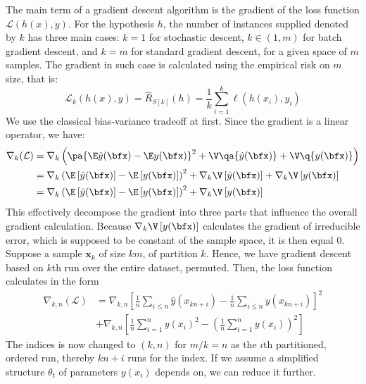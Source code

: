 \documentclass[
  journal=largetwo,
  year=2025,
  volume=37,
]{cup-journal}
\begin{document}
The main term of a gradient descent algorithm is the gradient of the loss function $\mathcal{L}(h(x),y)$. For the hypothesis $h$, the number of instances supplied denoted by $k$ has three main cases: $k=1$ for stochastic descent, $k\in (1,m)$ for batch gradient descent, and $k=m$ for standard gradient descent, for a given space of $m$ samples. The gradient in such case is calculated using the empirical risk on $m$ size, that is: 
\begin{equation}
    \mathcal{L}_{k}(h(x),y) = \hat{R}_{S[k]}(h) = \frac{1}{k} \sum^{k}_{i=1} \ell(h(x_{i}),y_{i})
\end{equation}
We use the classical bias-variance tradeoff at first. Since the gradient is a linear operator, we have: 
\begin{equation}
    \begin{split}
        \nabla_{k}(\mathcal{L}) &= \nabla_{k}\left(\pa{\E\hat{y}(\bfx) - \E y(\bfx)}^2 + \V\qa{\hat{y}(\bfx)} + \V\q{y(\bfx)}\right)\\
        & = \nabla_{k}\left( \E\left[\hat{y}(\bfx)\right] - \E\left[y(\bfx)\right] \right)^2 + \nabla_{k}\V\left[\hat{y}(\bfx)\right] + \nabla_{k}\V\left[y(\bfx)\right] \\
        & = \nabla_{k}\left( \E\left[\hat{y}(\bfx)\right] - \E\left[y(\bfx)\right] \right)^2 + \nabla_{k}\V\left[y(\bfx)\right]
    \end{split}
\end{equation}
This effectively decompose the gradient into three parts that influence the overall gradient calculation. Because $\nabla_{k}\V\left[y(\bfx)\right]$ calculates the gradient of irreducible error, which is supposed to be constant of the sample space, it is then equal $0$. Suppose a sample $\mathbf{x}_{k}$ of size $km$, of partition $k$. Hence, we have gradient descent based on $k$th run over the entire dataset, permuted. Then, the loss function calculates in the form 
\begin{equation}
  \begin{split}
    \nabla_{k,n}(\mathcal{L}) &= \nabla_{k,n}\left[ \frac{1}{n}\sum_{i\leq n} \hat{y}(x_{kn+i})  - \frac{1}{n}\sum_{i\leq n} y(x_{kn+i}) \right]^{2} \\
    &+ \nabla_{k,n} \left[ \frac{1}{n}\sum_{i=1}^n y(x_i)^2 - \left( \frac{1}{n}\sum_{i=1}^n y(x_i) \right)^2 \right]
  \end{split}
\end{equation}
The indices is now changed to $(k,n)$ for $m/k=n$ as the $i$th partitioned, ordered run, thereby $kn+i$ runs for the index. If we assume a simplified structure $\theta_{t}$ of parameters $y(x_{i})$ depends on, we can reduce it further.  
\end{document}
